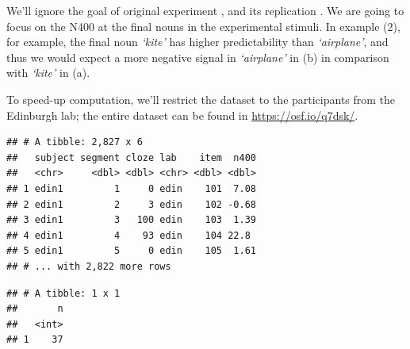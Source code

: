 \documentclass[12pt,]{krantz}
\newenvironment{Shaded}{\begin{snugshade}}{\end{snugshade}}
\newcommand{\CommentTok}[1]{\textcolor[rgb]{0.56,0.35,0.01}{\textit{#1}}}
\newcommand{\KeywordTok}[1]{\textcolor[rgb]{0.13,0.29,0.53}{\textbf{#1}}}
\newcommand{\NormalTok}[1]{#1}
\newcommand{\OperatorTok}[1]{\textcolor[rgb]{0.81,0.36,0.00}{\textbf{#1}}}
\newcommand{\StringTok}[1]{\textcolor[rgb]{0.31,0.60,0.02}{#1}}
\theoremstyle{definition}
\theoremstyle{definition}
\theoremstyle{definition}
\theoremstyle{remark}
\begin{document}
We'll ignore the goal of original experiment \citep{delongProbabilisticWordPreactivation2005}, and its replication \citep{nieuwlandLargescaleReplicationStudy2018}. We are going to focus on the N400 at the final nouns in the experimental stimuli. In example (2), for example, the final noun \emph{`kite'} has higher predictability than \emph{`airplane'}, and thus we would expect a more negative signal in \emph{`airplane'} in (b) in comparison with \emph{`kite'} in (a).

To speed-up computation, we'll restrict the dataset to the participants from the Edinburgh lab; the entire dataset can be found in \url{https://osf.io/q7dsk/}.

\begin{Shaded}
\end{Shaded}

\begin{verbatim}
## # A tibble: 2,827 x 6
##   subject segment cloze lab    item  n400
##   <chr>     <dbl> <dbl> <chr> <dbl> <dbl>
## 1 edin1         1     0 edin    101  7.08
## 2 edin1         2     3 edin    102 -0.68
## 3 edin1         3   100 edin    103  1.39
## 4 edin1         4    93 edin    104 22.8 
## 5 edin1         5     0 edin    105  1.61
## # ... with 2,822 more rows
\end{verbatim}

\begin{Shaded}
\end{Shaded}

\begin{verbatim}
## # A tibble: 1 x 1
##       n
##   <int>
## 1    37
\end{verbatim}
\end{document}
